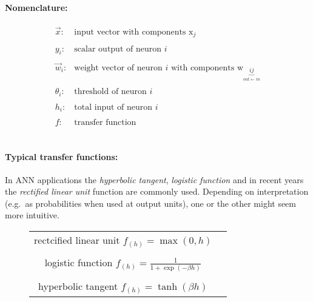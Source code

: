 \paragraph{Nomenclature:}
\[ \begin{array}{ll}
	\vec{x}: & \text{input vector with components } \mathrm{x}_j \\\\
	y_i: & \text{scalar output of neuron } i \\\\
	\vec{w}_i: & \text{weight vector of neuron } i \text{ with components }
		\mathrm{w}_{\underbrace{ij}_{out \leftarrow in}} \\\\
	\theta_i: & \text{threshold of neuron } i \\\\
	h_i: & \text{total input of neuron } i \\\\
	f: & \text{transfer function}
\end{array} \]
\\

\paragraph{Typical transfer functions:} In ANN applications the \emph{hyperbolic tangent}, \emph{logistic function} and in recent years the \emph{rectified linear unit} function are commonly used. Depending on interpretation (e.g.\ as probabilities when used at output units), one or the other might seem more intuitive. 
\begin{figure}[h]
  \centering
  \begin{tabular}[h]{c c}   
\parbox{4cm}{rectcified linear unit \\ $f_{(h)} = \max(0, h)$ } & 
\\
\\
\parbox{4cm}{logistic function \\ $f_{(h)} = \frac{1}{1 + \exp (-\beta h)}$ } & 
\\
\\
\parbox{4cm}{hyperbolic tangent\\$f_{(h)} = \tanh(\beta h)$} &
\end{tabular}
\end{figure}


